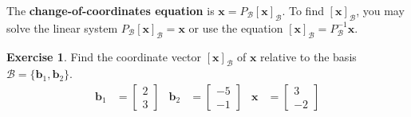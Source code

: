 \documentclass[10pt]{book}
\newcommand{\boxcolor}{gray!30}
\newenvironment{boxdef}{\begin{mdframed}[backgroundcolor=\boxcolor,linewidth=0pt,nobreak=true]}{\end{mdframed}}
\theoremstyle{definition}
\newtheorem{exercise}{Exercise}[section]
\newcommand{\R}{\mathbb{R}}
\newcommand{\B}{\mathscr{B}}
\newcommand{\vect}[1]{\ensuremath{\boldsymbol{\mathbf{#1}}}}
\newcommand{\vectB}[1][x]{[\vect{#1}]_\B}
\begin{document}
\begin{boxdef}
	The \textbf{change-of-coordinates equation} is $\vect{x}=P_\B\vectB$. To find $\vectB$, you may solve the linear system $P_\B\vectB=\vect{x}$ or use the equation $\vectB=P_\B^{-1}\vect{x}$.
\end{boxdef}
\begin{exercise} %
	Find the coordinate vector $\vectB$ of $\vect{x}$ relative to the basis $\B=\{\vect{b}_1,\vect{b}_2\}$.
	\begin{align*}
	\vect{b}_1 &= \begin{bmatrix}2\\3\end{bmatrix} &
	\vect{b}_2 &= \begin{bmatrix}-5\\-1\end{bmatrix} &
	\vect{x} &= \begin{bmatrix}3\\-2\end{bmatrix}
	\end{align*}
\end{exercise}
\vfill
\end{document}
